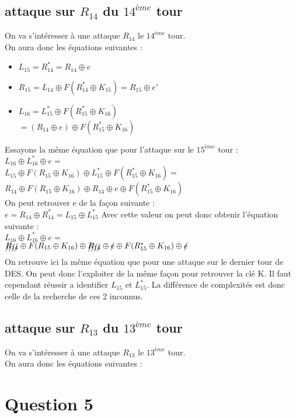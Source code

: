 \documentclass[a4paper,11pt]{article}
\begin{document}
	\subsection{attaque sur $R_{14}$ du $14^{ème}$ tour}
	On va s'intéresser à une attaque $R_{14}$ le $14^{ème}$ tour.\\
	On aura donc les équations suivantes :
	\begin{itemize}
		\item $L_{15} = R_{14}^{*} = R_{14} \oplus e$
		\item $R_{15} = L_{14}\oplus F( R_{14}^{*}\oplus K_{15}) = R_{15} \oplus e'$
		\item $L_{16} = L_{15}^{*}\oplus F( R_{15}^{*}\oplus K_{16})$\\
		$= (R_{14} \oplus e)\oplus  F( R_{15}^{*}\oplus K_{16})$
	\end{itemize}
	Essayons la même équation que pour l'attaque sur le $15^{ème}$ tour :\\
	$L_{16} \oplus L_{16}^{*} \oplus e = $\\ 
	$L_{15}\oplus  F( R_{15}\oplus K_{16})\oplus L_{15}^{*} \oplus F( R_{15}^{*}\oplus K_{16}) =$\\
	$R_{14}\oplus  F( R_{15}\oplus K_{16})\oplus  R_{14} \oplus e \oplus F( R_{15}^{*}\oplus K_{16})$\\
	On peut retrouver e de la façon suivante :\\
	$e = R_{14}\oplus R_{14}^{*} = L_{15}\oplus  L_{15}^{*}$
	Avec cette valeur on peut donc obtenir l'équation suivante :\\
	$L_{16} \oplus L_{16}^{*} \oplus e = $\\ 
	$\xout{R_{14}}\oplus  F( R_{15}\oplus K_{16})\oplus  \xout{R_{14}} \oplus \xout{e} \oplus F( R_{15}^{*}\oplus K_{16})\oplus \xout{e}$\\
	On retrouve ici la même équation que pour une attaque sur le dernier tour de DES. On peut donc l'exploiter de la même façon pour retrouver la clé K. Il faut cependant réussir a identifier $L_{15}$ et $L_{15}^{*}$. La différence de complexités est donc celle de la recherche de ces 2 inconnus.\\
	\subsection{attaque sur $R_{13}$ du $13^{ème}$ tour}
		On va s'intéresser à une attaque $R_{13}$ le $13^{ème}$ tour.\\
	On aura donc les équations suivantes :
	\section{Question 5}
\end{document}

